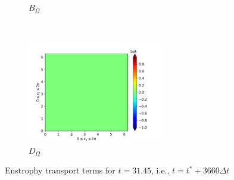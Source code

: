 \begin{figure}[H]
\begin{subfigure}{0.45\textwidth}
        \caption{$B_{\Omega}$}
    \end{subfigure}
    ~
    \begin{subfigure}{0.45\textwidth}
        \includegraphics[height=1.75in]{media/run-cds-65-5k/D-enst-4750}
        \caption{$D_{\Omega}$}
    \end{subfigure}
    \caption{Enstrophy transport terms for $t=31.45$, i.e., $t=t^{\ast} + 3660 \Delta t$}
\end{figure}

\newpage

